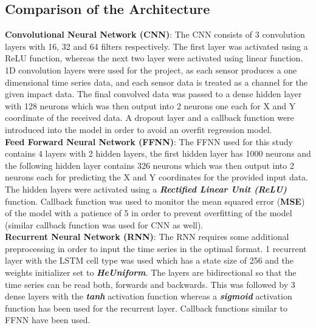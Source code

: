 \documentclass[12pt]{article}
\begin{document}
\subsection{Comparison of the Architecture}
\par
\textbf{Convolutional Neural Network (CNN)}: The CNN consists of 3 convolution layers with 16, 32 and 64 filters respectively. The first layer was activated using a ReLU function, whereas the next two layer were activated using linear function. 1D convolution layers were used for the project, as each sensor produces a one dimensional time series data, and each sensor data is treated as a channel for the given impact data. The final convolved data was passed to a dense hidden layer with 128 neurons which was then output into 2 neurons one each for X and Y coordinate of the received data. A dropout layer and a callback function were introduced into the model in order to avoid an overfit regression model.\\
\textbf{Feed Forward Neural Network (FFNN)}: The FFNN used for this study contains 4 layers with 2 hidden layers, the first hidden layer has 1000 neurons and the following hidden layer contains 326 neurons which was then output into 2 neurons each for predicting the X and Y coordinates for the provided input data. The hidden layers were activated using a \emph{\textbf{Rectified Linear Unit (ReLU)}} function. Callback function was used to monitor the mean squared error (\textbf{MSE}) of the model with a patience of 5 in order to prevent overfitting of the model (similar callback function was used for CNN as well).\\
\textbf{Recurrent Neural Network (RNN)}: The RNN requires some additional preprocessing in order to input the time series in the optimal format. 1 recurrent layer with the LSTM cell type was used which has a state size of 256 and the weights initializer set to \emph{\textbf{HeUniform}}. The layers are bidirectional so that the time series can be read both, forwards and backwards. This was followed by 3 dense layers with the \emph{\textbf{tanh}} activation function whereas a \emph{\textbf{sigmoid}} activation function has been used for the recurrent layer. Callback functions similar to FFNN have been used.

\par
\end{document}
